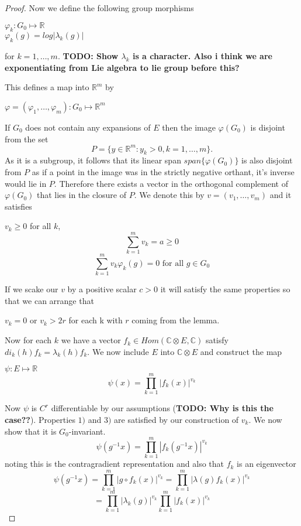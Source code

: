 \begin{proof}
    Now we define the following group morphisms
    \begin{center}
        $\varphi_k : G_0 \mapsto \mathbb{R}$\\
        $ \varphi_k(g) = log|\lambda_k(g)|$
    \end{center}
    for $k = 1,\dots, m$.
    \textbf{TODO: Show $\lambda_k$ is a character. Also i think we are exponentiating from Lie algebra to lie group before this?}

    This defines a map into $\mathbb{R}^m$ by
    \begin{center}
        $\varphi=(\varphi_1 , \dots , \varphi_m): G_0 \mapsto \mathbb{R}^m$
    \end{center}
    If $G_0$ does not contain any expansions of $E$ then the image $\varphi(G_0)$ is disjoint from the set
    $$
        P = \{y \in \mathbb{R}^m: y_k>0, k=1,\dots ,m\}.
    $$
    As it is a subgroup, it follows that its linear span $span\{\varphi(G_0)\}$ is also disjoint from $P$ as if a point in the image was
    in the strictly negative orthant, it's inverse would lie in $P$. Therefore there exists a vector in the orthogonal complement
    of $\varphi(G_0)$ that lies in the closure of $P$. We denote this by $v = (v_1,\dots, v_m)$ and it satisfies
    \begin{center}
        $v_k \geq 0$ for all $k$,
        \[\sum^m_{k=1}v_k = a \geq 0\]
        \[\sum^m_{k=1}v_k\varphi_k(g) =0 \text{ for all } g\in G_0\]
    \end{center}
    If we scake our $v$ by a positive scalar $c>0$ it will satisfy the same properties so that we can arrange that
    \begin{center}
        $v_k =0$ or $v_k>2r$ for each k with $r$ coming from the lemma.

        Now for each $k$ we have a vector $f_k\in Hom(\mathbb{C}\otimes E, \mathbb{C})$
        satisfy $di_k(h)f_k = \lambda_k(h)f_k$. We now include $E$ into
        $\mathbb{C}\otimes E$ and construct the map
        \begin{center}
            $\psi: E \mapsto \mathbb{R}$
            \[\psi(x) = \prod_{k=1}^{m}|f_k(x)|^{v_k}\]
        \end{center}
    \end{center}
    Now $\psi$ is $C^r$ differentiable by our assumptions (\textbf{TODO: Why is this the case??}). Properties
    $1)$ and $3)$ are satisfied by our construction of $v_k$. We now show that it is $G_0$-invariant.
    \[\psi(g^{-1}x) = \prod_{k=1}^{m}|f_k(g^{-1}x)|^{v_k} \]
    noting this is the contragradient representation and also that $f_k$ is an
    eigenvector
    \[\psi(g^{-1}x)  = \prod_{k=1}^{m}|g\circ f_k(x)|^{v_k} = \prod_{k=1}^{m}|\lambda(g)f_k(x)|^{v_k}\]
    \[= \prod_{k=1}^{m}|\lambda_k(g)|^{v_k}\prod_{k=1}^{m}|f_k(x)|^{v_k}\]


\end{proof}
